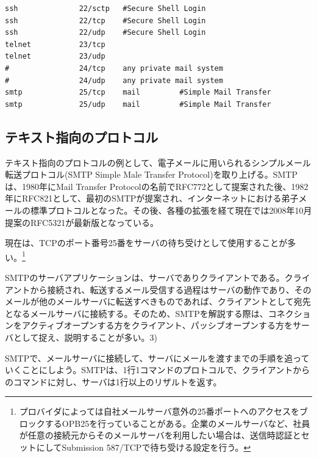 \begin{verbatim}
ssh              22/sctp   #Secure Shell Login
ssh              22/tcp    #Secure Shell Login
ssh              22/udp    #Secure Shell Login
telnet           23/tcp
telnet           23/udp
#                24/tcp    any private mail system
#                24/udp    any private mail system
smtp             25/tcp    mail         #Simple Mail Transfer
smtp             25/udp    mail         #Simple Mail Transfer
\end{verbatim}


\subsection{テキスト指向のプロトコル}

テキスト指向のプロトコルの例として、電子メールに用いられるシンプルメール転送プロトコル(SMTP Simple Male Transfer Protocol)を取り上げる。SMTPは、1980年にMail Transfer Protocolの名前でRFC772として提案された後、1982年にRFC821として、最初のSMTPが提案され、インターネットにおける弟子メールの標準プロトコルとなった。その後、各種の拡張を経て現在では2008年10月提案のRFC5321が最新版となっている。

現在は、TCPのポート番号25番をサーバの待ち受けとして使用することが多い。\footnote{プロバイダによっては自社メールサーバ意外の25番ポートへのアクセスをブロックするOPB25を行っていることがある。企業のメールサーバなど、社員が任意の接続元からそのメールサーバを利用したい場合は、送信時認証とセットにしてSubmission 587/TCPで待ち受ける設定を行う。}

SMTPのサーバアプリケーションは、サーバでありクライアントである。クライアントから接続され、転送するメール受信する過程はサーバの動作であり、そのメールが他のメールサーバに転送すべきものであれば、クライアントとして宛先となるメールサーバに接続する。そのため、SMTPを解説する際は、コネクションをアクティブオープンする方をクライアント、パッシブオープンする方をサーバとして捉え、説明することが多い。3)

SMTPで、メールサーバに接続して、サーバにメールを渡すまでの手順を追っていくことにしよう。SMTPは、1行1コマンドのプロトコルで、クライアントからのコマンドに対し、サーバは1行以上のリザルトを返す。

